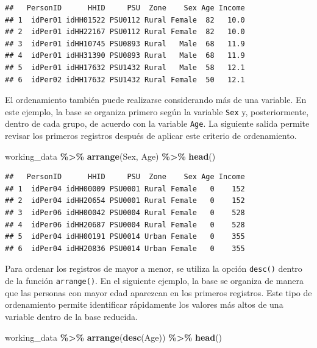 \documentclass[
  spanish,
  12pt,
]{book}
\newenvironment{Shaded}{\begin{snugshade}}{\end{snugshade}}
\newcommand{\FunctionTok}[1]{\textcolor[rgb]{0.13,0.29,0.53}{\textbf{#1}}}
\newcommand{\NormalTok}[1]{#1}
\newcommand{\SpecialCharTok}[1]{\textcolor[rgb]{0.81,0.36,0.00}{\textbf{#1}}}
\begin{document}
\begin{verbatim}
##   PersonID      HHID     PSU  Zone    Sex Age Income
## 1  idPer01 idHH01522 PSU0112 Rural Female  82   10.0
## 2  idPer01 idHH22167 PSU0112 Rural Female  82   10.0
## 3  idPer01 idHH10745 PSU0893 Rural   Male  68   11.9
## 4  idPer01 idHH31390 PSU0893 Rural   Male  68   11.9
## 5  idPer01 idHH17632 PSU1432 Rural   Male  58   12.1
## 6  idPer02 idHH17632 PSU1432 Rural Female  50   12.1
\end{verbatim}

El ordenamiento también puede realizarse considerando más de una variable. En este ejemplo, la base se organiza primero según la variable \texttt{Sex} y, posteriormente, dentro de cada grupo, de acuerdo con la variable \texttt{Age}. La siguiente salida permite revisar los primeros registros después de aplicar este criterio de ordenamiento.

\begin{Shaded}
\begin{Highlighting}[]
\NormalTok{working\_data }\SpecialCharTok{\%\textgreater{}\%}
  \FunctionTok{arrange}\NormalTok{(Sex, Age) }\SpecialCharTok{\%\textgreater{}\%}
  \FunctionTok{head}\NormalTok{()}
\end{Highlighting}
\end{Shaded}

\begin{verbatim}
##   PersonID      HHID     PSU  Zone    Sex Age Income
## 1  idPer04 idHH00009 PSU0001 Rural Female   0    152
## 2  idPer04 idHH20654 PSU0001 Rural Female   0    152
## 3  idPer06 idHH00042 PSU0004 Rural Female   0    528
## 4  idPer06 idHH20687 PSU0004 Rural Female   0    528
## 5  idPer04 idHH00191 PSU0014 Urban Female   0    355
## 6  idPer04 idHH20836 PSU0014 Urban Female   0    355
\end{verbatim}

Para ordenar los registros de mayor a menor, se utiliza la opción \texttt{desc()} dentro de la función \texttt{arrange()}. En el siguiente ejemplo, la base se organiza de manera que las personas con mayor edad aparezcan en los primeros registros. Este tipo de ordenamiento permite identificar rápidamente los valores más altos de una variable dentro de la base reducida.

\begin{Shaded}
\begin{Highlighting}[]
\NormalTok{working\_data }\SpecialCharTok{\%\textgreater{}\%}
  \FunctionTok{arrange}\NormalTok{(}\FunctionTok{desc}\NormalTok{(Age)) }\SpecialCharTok{\%\textgreater{}\%}
  \FunctionTok{head}\NormalTok{()}
\end{Highlighting}
\end{Shaded}
\end{document}
